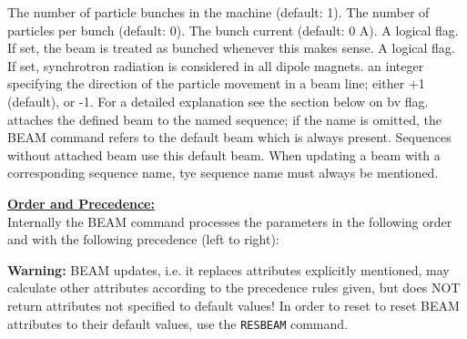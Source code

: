 \begin{madlist}
   The number of particle bunches in the
  machine (default: 1).  
   \label{beam_npart} The number of particles per bunch (default: 0). 
   The bunch current (default: 0 A). 
   A logical flag. If set, the beam is
  treated as bunched whenever this makes sense.  
   \label{beam_radiate} A logical flag. If set, synchrotron
  radiation is considered in all dipole magnets.  
   an integer specifying the direction of the
  particle movement in a beam line; either +1 (default), or -1. For a
  detailed explanation see the section below on bv flag.  
   attaches the defined beam to the named sequence; if
  the name is omitted, the BEAM command refers to the default beam
  which is always present. Sequences without attached beam use this
  default beam. When updating a beam with a corresponding sequence name,
  tye sequence name must always be mentioned.    
\end{madlist} 

{\bf \underline{Order and Precedence:}}\\
Internally the BEAM command processes the parameters in the following
order and with the following precedence (left to right): 
\begin{5.02.06}
\end{5.02.06}
\begin{5.03.00}
\end{5.03.00}


{\bf Warning:} BEAM updates, i.e. it replaces attributes explicitly
mentioned, may calculate other attributes according to the precedence rules
given, but does NOT return attributes not specified to default values! 
In order to reset to reset BEAM attributes to their default values, use
the {\tt RESBEAM} command.


